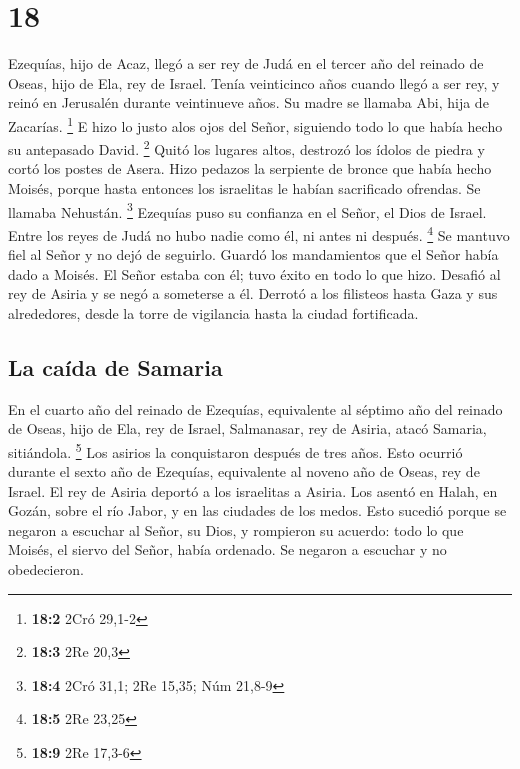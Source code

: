 \hypertarget{section-17}{%
\section{18}\label{section-17}}

 Ezequías, hijo de Acaz, llegó a ser rey de Judá en el
tercer año del reinado de Oseas, hijo de Ela, rey de Israel.
 Tenía veinticinco años cuando llegó a ser rey, y reinó en
Jerusalén durante veintinueve años. Su madre se llamaba Abi, hija de
Zacarías. \footnote{\textbf{18:2} 2Cró 29,1-2}  E hizo lo
justo alos ojos del Señor, siguiendo todo lo que había hecho su
antepasado David. \footnote{\textbf{18:3} 2Re 20,3}  Quitó
los lugares altos, destrozó los ídolos de piedra y cortó los postes de
Asera. Hizo pedazos la serpiente de bronce que había hecho Moisés,
porque hasta entonces los israelitas le habían sacrificado ofrendas. Se
llamaba Nehustán. \footnote{\textbf{18:4} 2Cró 31,1; 2Re 15,35; Núm
  21,8-9}  Ezequías puso su confianza en el Señor, el Dios
de Israel. Entre los reyes de Judá no hubo nadie como él, ni antes ni
después. \footnote{\textbf{18:5} 2Re 23,25}  Se mantuvo
fiel al Señor y no dejó de seguirlo. Guardó los mandamientos que el
Señor había dado a Moisés.  El Señor estaba con él; tuvo
éxito en todo lo que hizo. Desafió al rey de Asiria y se negó a
someterse a él.  Derrotó a los filisteos hasta Gaza y sus
alrededores, desde la torre de vigilancia hasta la ciudad fortificada.

\hypertarget{la-cauxedda-de-samaria}{%
\subsection{La caída de Samaria}\label{la-cauxedda-de-samaria}}

 En el cuarto año del reinado de Ezequías, equivalente al
séptimo año del reinado de Oseas, hijo de Ela, rey de Israel,
Salmanasar, rey de Asiria, atacó Samaria, sitiándola. \footnote{\textbf{18:9}
  2Re 17,3-6}  Los asirios la conquistaron después de
tres años. Esto ocurrió durante el sexto año de Ezequías, equivalente al
noveno año de Oseas, rey de Israel.  El rey de Asiria
deportó a los israelitas a Asiria. Los asentó en Halah, en Gozán, sobre
el río Jabor, y en las ciudades de los medos.  Esto
sucedió porque se negaron a escuchar al Señor, su Dios, y rompieron su
acuerdo: todo lo que Moisés, el siervo del Señor, había ordenado. Se
negaron a escuchar y no obedecieron.

